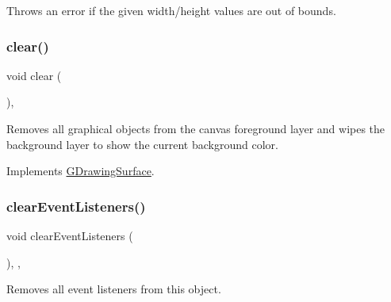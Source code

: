 Throws an error if the given width/height values are out of bounds. 

\mbox{\label{classsgl_1_1GCanvas_aee7cb2065b88d21ac4ad05bc997ecf82}} 
\subsubsection{\texorpdfstring{clear()}{clear()}}
{\footnotesize\ttfamily void clear (\begin{DoxyParamCaption}{ }\end{DoxyParamCaption})\hspace{0.3cm}{\ttfamily [override]}, {\ttfamily [virtual]}}



Removes all graphical objects from the canvas foreground layer and wipes the background layer to show the current background color. 



Implements \mbox{\hyperlink{classsgl_1_1GDrawingSurface_a5eeb94d22b8366d1b68d0614384802fe}{G\+Drawing\+Surface}}.

\mbox{\label{classsgl_1_1GObservable_a80cfa040459ff53594adbd6a51ec8f43}} 
\subsubsection{\texorpdfstring{clear\+Event\+Listeners()}{clearEventListeners()}}
{\footnotesize\ttfamily void clear\+Event\+Listeners (\begin{DoxyParamCaption}{ }\end{DoxyParamCaption})\hspace{0.3cm}{\ttfamily [protected]}, {\ttfamily [virtual]}, {\ttfamily [inherited]}}



Removes all event listeners from this object. 

\mbox{\label{classsgl_1_1GCanvas_a6614e1320bc8e93b20df129613e5a0ff}} 
